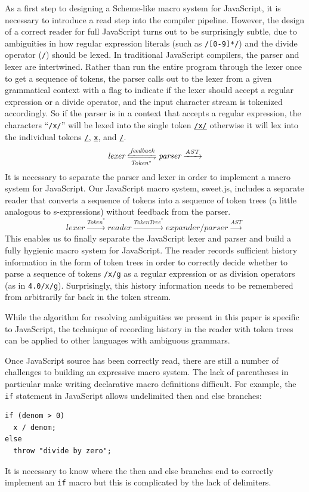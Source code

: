 \documentclass[9pt]{sigplanconf}
\begin{document}
As a first step to designing a Scheme-like macro system for
JavaScript, it is necessary to introduce a read step into the compiler
pipeline. However, the design of a correct reader for full JavaScript
turns out to be surprisingly subtle, due to ambiguities in how regular
expression literals (such as \verb!/[0-9]*/!) and the divide
operator (\verb!/!) should be lexed. In traditional JavaScript
compilers, the parser and lexer are intertwined. Rather than run the
entire program through the lexer once to get a sequence of tokens, the
parser calls out to the lexer from a given grammatical context with a
flag to indicate if the lexer should accept a regular expression or
a divide operator, and the input character stream is tokenized accordingly.
So if the parser is in a context that accepts a regular expression, the characters ``\verb!/x/!'' will be lexed into the single token \underline{\verb!/x/!} otherwise it will lex into the individual tokens \underline{\verb!/!}, \underline{\verb!x!}, and \underline{\verb!/!}.
\[
\textit{lexer} \xleftrightharpoons[\textit{Token}^{*}]{\textit{feedback}}
\textit{parser} \xrightarrow{\textit{AST}}
\]
It is necessary to separate the parser and lexer in order to implement
a macro system for JavaScript. Our JavaScript macro system,
sweet.js, includes a separate
reader that converts a sequence of tokens into a sequence of token
trees (a little analogous to s-expressions) without feedback from the
parser.
\[
\textit{lexer} \xrightarrow{\textit{Token}^{*}}
\textit{reader} \xrightarrow{\textit{TokenTree}^{*}}
\textit{expander/parser} \xrightarrow{\textit{AST}}
\]
This enables us to finally separate the JavaScript lexer and parser
and build a fully hygienic macro system for JavaScript. The reader
records sufficient history information in the form of token trees in
order to correctly decide whether to parse a sequence of tokens
\verb!/x/g! as a regular expression or as division operators (as in
\verb!4.0/x/g!). Surprisingly, this history information needs to be
remembered from arbitrarily far back in the token stream.

While the algorithm for resolving ambiguities we present in this paper
is specific to JavaScript, the technique of recording history in the
reader with token trees can be applied to other languages with
ambiguous grammars.

Once JavaScript source has been correctly read, there are still a
number of challenges to building an expressive macro system. The lack
of parentheses in particular make writing declarative macro
definitions difficult. For example, the \verb!if! statement in
JavaScript allows undelimited then and else branches:
\begin{lstlisting}
if (denom > 0)
  x / denom;
else
  throw "divide by zero";
\end{lstlisting}
It is necessary to know where the then and else branches end to
correctly implement an \verb!if! macro but this is complicated by
the lack of delimiters. 
\end{document}
